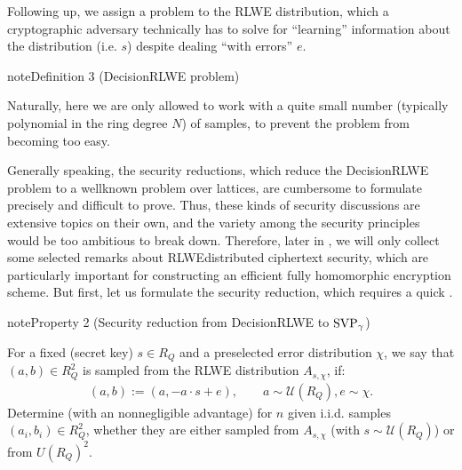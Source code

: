 \documentclass[letterpaper,10pt,english]{jupyterBook}
\begin{document}
\sphinxAtStartPar
Following up, we assign a problem to the RLWE distribution, which a cryptographic adversary technically has to solve for “learning” information about the distribution (i.e. \(s\)) despite dealing “with errors” \(e\).
\label{Thesis:decision-RLWE}
\begin{sphinxadmonition}{note}{Definition 3 (Decision\sphinxhyphen{}RLWE problem)}
\end{sphinxadmonition}

\sphinxAtStartPar
Naturally, here we are only allowed to work with a quite small number (typically polynomial in the ring degree \(N\)) of samples, to prevent the problem from becoming too easy.

\sphinxAtStartPar
Generally speaking, the security reductions, which reduce the Decision\sphinxhyphen{}RLWE problem to a well\sphinxhyphen{}known problem over lattices, are cumbersome to formulate precisely and difficult to prove.
Thus, these kinds of security discussions are extensive topics on their own, and the variety among the security principles would be too ambitious to break down.
Therefore, later in {\hyperref[\detokenize{Thesis:remarks-on-security}]{}}, we will only collect some selected remarks about RLWE\sphinxhyphen{}distributed ciphertext security, which are particularly important for constructing an efficient fully homomorphic encryption scheme.
But first, let us formulate the security reduction, which requires a quick {\hyperref[\detokenize{Thesis:background-on-lattices}]{}}.
\label{Thesis:RLWE-security}
\begin{sphinxadmonition}{note}{Property 2 (Security reduction from Decision\sphinxhyphen{}RLWE to \protect\(\mathrm{SVP}_\gamma\protect\))}
\end{sphinxadmonition}
\label{\detokenize{Thesis:background-on-lattices}}
\sphinxAtStartPar
For a fixed (secret key) \(s \in R_Q\) and a preselected error distribution \(\chi\), we say that \((a,b) \in R_Q^2\) is sampled from the RLWE distribution \(A_{s,\chi}\), if:
\begin{equation*}
\begin{split}(a,b) := (a, -a\cdot s + e), \qquad a \sim \mathcal U(R_Q), e \sim \chi.\end{split}
\end{equation*}
\sphinxAtStartPar
Determine (with an non\sphinxhyphen{}negligible advantage) for \(n\) given i.i.d. samples \((a_i,b_i) \in R_Q^2\), whether they are either sampled from \(A_{s,\chi}\) (with \(s \sim \mathcal U(R_Q)\)) or from \(U(R_Q)^2\).
\end{document}
